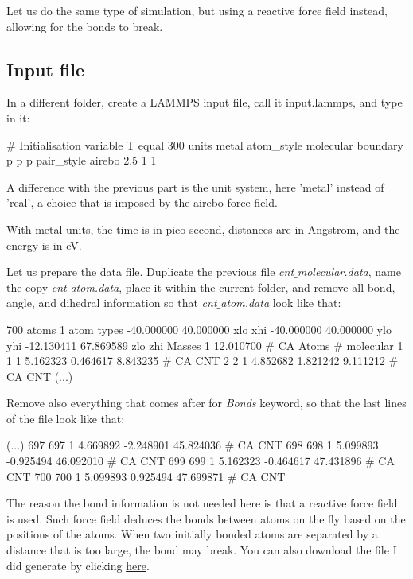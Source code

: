 Let us do the same type of simulation, but using a reactive force field 
instead, allowing for the bonds to break.

\subsection{Input file}

\noindent In a different folder, create a LAMMPS input file, call it
input.lammps, and type in it:

\begin{lcverbatim}
# Initialisation
variable T equal 300
units metal
atom_style molecular
boundary p p p
pair_style airebo 2.5 1 1
\end{lcverbatim}

\noindent A difference with the previous part
is the unit system, here 'metal' instead of 'real', a choice
that is imposed by the airebo force field.

\begin{tcolorbox}[colback=mylightblue!5!white,colframe=mylightblue!75!black,title=About metal units]
With metal units, the time is in pico second, 
distances are in Angstrom, and the energy is in eV.
\end{tcolorbox}

\noindent Let us prepare the data file. Duplicate the 
previous file \textit{cnt$\_$molecular.data}, name the copy \textit{cnt$\_$atom.data},
place it within the 
current folder, and remove all bond, angle, and dihedral 
information so that \textit{cnt$\_$atom.data} look like that: 

\begin{lcverbatim}
700 atoms
1 atom types
-40.000000 40.000000  xlo xhi
-40.000000 40.000000  ylo yhi
-12.130411 67.869589  zlo zhi
Masses
1 12.010700 # CA
Atoms # molecular
1 1 1 5.162323 0.464617 8.843235 # CA CNT
2 2 1 4.852682 1.821242 9.111212 # CA CNT
(...)
\end{lcverbatim}

\noindent Remove also everything that comes after for \textit{Bonds}
keyword, so that the last lines of the file look like that:

\begin{lcverbatim}
(...)
697 697 1 4.669892 -2.248901 45.824036 # CA CNT
698 698 1 5.099893 -0.925494 46.092010 # CA CNT
699 699 1 5.162323 -0.464617 47.431896 # CA CNT
700 700 1 5.099893 0.925494 47.699871 # CA CNT
\end{lcverbatim}

\noindent The reason the bond information is not needed here is that 
a reactive force field is used. Such force field 
deduces the bonds between atoms on the fly based on the positions of the atoms.
When two initially bonded atoms are separated by a 
distance that is too large, the bond may break. 
You can also download the file I did generate 
by clicking \href{../../../../../inputs/level1/breaking-a-carbon-nanotube/breakable-bonds/cnt_atom.data}{here}.

